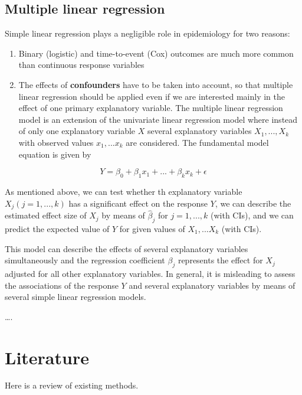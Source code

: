 \documentclass[
]{book}
\providecommand{\tightlist}{%
  \setlength{\itemsep}{0pt}\setlength{\parskip}{0pt}}
\begin{document}
\hypertarget{multiple-linear-regression}{%
\section{Multiple linear regression}\label{multiple-linear-regression}}

Simple linear regression plays a negligible role in epidemiology for two reasons:

\begin{enumerate}
\def\labelenumi{\arabic{enumi}.}
\tightlist
\item
  Binary (logistic) and time-to-event (Cox) outcomes are much more common than continuous response variables
\item
  The effects of \textbf{confounders} have to be taken into account, so that multiple linear regression should be applied even if we are interested mainly in the effect of one primary explanatory variable. The multiple linear regression model is an extension of the univariate linear regression model where instead of only one explanatory variable \(X\) several explanatory variables \(X_1,...,X_k\) with observed values \(x_1,...x_k\) are considered. The fundamental model equation is given by
\end{enumerate}

\[
Y = \beta_0 + \beta_1 x_1 + ... + \beta_k x_k + \epsilon
\]

As mentioned above, we can test whether th explanatory variable \(X_j (j=1, ..., k)\) has a significant effect on the response \(Y\), we can describe the estimated effect size of \(X_j\) by means of \(\hat{\beta}_j\) for \(j=1,...,k\) (with CIs), and we can predict the expected value of \(Y\) for given values of \(X_1, ... X_k\) (with CIs).

This model can describe the effects of several explanatory variables simultaneously and the regression coefficient \(\beta_j\) represents the effect for \(X_j\) adjusted for all other explanatory variables. In general, it is misleading to assess the associations of the response \(Y\) and several explanatory variables by means of several simple linear regression models.

\ldots.

\hypertarget{literature}{%
\chapter{Literature}\label{literature}}

Here is a review of existing methods.

  
\end{document}
